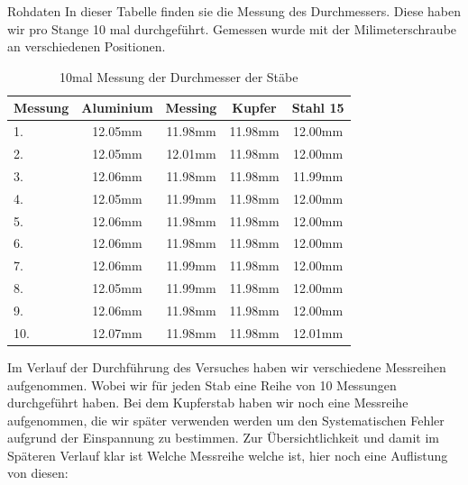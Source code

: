 \documentclass[twoside]{protokoll}
\begin{document}
\begin{aufgabe}{Rohdaten}
In dieser Tabelle finden sie die Messung des Durchmessers. Diese haben wir pro Stange 10 mal durchgeführt. Gemessen wurde mit der Milimeterschraube an verschiedenen Positionen.\\
    \begin{table}[H]
        \centering
        \begin{tabularx}{0.8\textwidth}{X c c c c} %
            \toprule
            \textbf{Messung} & \textbf{Aluminium} & \textbf{Messing} & \textbf{Kupfer} & \textbf{Stahl 15} \\
            \midrule
            1. & 12.05mm & 11.98mm & 11.98mm & 12.00mm \\
            2. & 12.05mm & 12.01mm & 11.98mm & 12.00mm \\
            3. & 12.06mm & 11.98mm & 11.98mm & 11.99mm \\
            4. & 12.05mm & 11.99mm & 11.98mm & 12.00mm \\
            5. & 12.06mm & 11.98mm & 11.98mm & 12.00mm \\
            6. & 12.06mm & 11.98mm & 11.98mm & 12.00mm \\
            7. & 12.06mm & 11.99mm & 11.98mm & 12.00mm \\
            8. & 12.05mm & 11.99mm & 11.98mm & 12.00mm \\
            9. & 12.06mm & 11.98mm & 11.98mm & 12.00mm \\
            10.& 12.07mm & 11.98mm & 11.98mm & 12.01mm \\
            \bottomrule
        \end{tabularx}
        \caption{10mal Messung der Durchmesser der Stäbe}
        \label{tab:mytable}
    \end{table}

Im Verlauf der Durchführung des Versuches haben wir verschiedene Messreihen aufgenommen. Wobei wir für jeden Stab eine Reihe von 10 Messungen durchgeführt haben. Bei dem Kupferstab haben wir noch eine Messreihe aufgenommen, die wir später verwenden werden um den Systematischen Fehler aufgrund der Einspannung zu bestimmen. Zur Übersichtlichkeit und damit im Späteren Verlauf klar ist Welche Messreihe welche ist, hier noch eine Auflistung von diesen:\\


\end{aufgabe}
\end{document}
